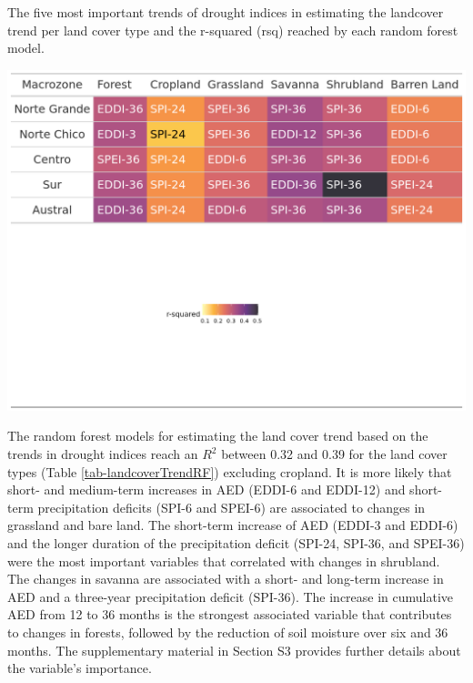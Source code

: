 \documentclass[
  authoryear,
  preprint,
  3p,
  onecolumn]{elsarticle}
\begin{document}
\begin{table}[!ht]
\caption{The five most important trends of drought indices in estimating the landcover trend per land cover type and the r-squared (rsq) reached by each random forest model.}
\label{tab-landcoverTrendRF}
\includegraphics[]{../output/figs/table_r2_most_important_variables.png}
\end{table}

The random forest models for estimating the land cover trend based on
the trends in drought indices reach an \(R^2\) between 0.32 and 0.39 for
the land cover types (Table \ref{tab-landcoverTrendRF}) excluding
cropland. It is more likely that short- and medium-term increases in AED
(EDDI-6 and EDDI-12) and short-term precipitation deficits (SPI-6 and
SPEI-6) are associated to changes in grassland and bare land. The
short-term increase of AED (EDDI-3 and EDDI-6) and the longer duration
of the precipitation deficit (SPI-24, SPI-36, and SPEI-36) were the most
important variables that correlated with changes in shrubland. The
changes in savanna are associated with a short- and long-term increase
in AED and a three-year precipitation deficit (SPI-36). The increase in
cumulative AED from 12 to 36 months is the strongest associated variable
that contributes to changes in forests, followed by the reduction of
soil moisture over six and 36 months. The supplementary material in
Section S3 provides further details about the variable's importance.
\end{document}
